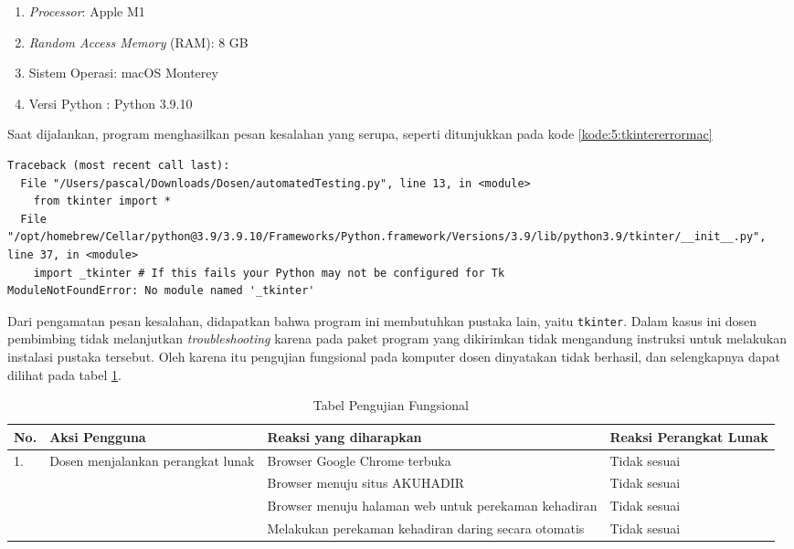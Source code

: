 \begin{enumerate}
	\item \textit{Processor}: Apple M1
	\item \textit{Random Access Memory} (RAM): 8 GB
	\item Sistem Operasi: macOS Monterey
	\item Versi Python : Python 3.9.10
\end{enumerate}

Saat dijalankan, program menghasilkan pesan kesalahan yang serupa, seperti ditunjukkan pada kode \ref{kode:5:tkintererrormac}

\begin{lstlisting}[caption=Pesan kesalahan skrip tanpa \textit{tkinter}) pada komputer alternatif, label=kode:5:tkintererrormac]
 % python3 automatedTesting.py
Traceback (most recent call last):
  File "/Users/pascal/Downloads/Dosen/automatedTesting.py", line 13, in <module>
    from tkinter import * 
  File "/opt/homebrew/Cellar/python@3.9/3.9.10/Frameworks/Python.framework/Versions/3.9/lib/python3.9/tkinter/__init__.py", line 37, in <module>
    import _tkinter # If this fails your Python may not be configured for Tk
ModuleNotFoundError: No module named '_tkinter'
\end{lstlisting}

Dari pengamatan pesan kesalahan, didapatkan bahwa program ini membutuhkan pustaka lain, yaitu \texttt{tkinter}. Dalam kasus ini dosen pembimbing tidak melanjutkan \textit{troubleshooting} karena pada paket program yang dikirimkan tidak mengandung instruksi untuk melakukan instalasi pustaka tersebut. Oleh karena itu pengujian fungsional pada komputer dosen dinyatakan tidak berhasil, dan selengkapnya dapat dilihat pada tabel \ref{tab:fungsidosen}.

\begin{table}[H]			
	\caption{Tabel Pengujian Fungsional}
	\centering
	\begin{tabular}{|p{0.5cm} |p{4cm} |p{5.5cm}| p{3cm}|} \hline
		No. & Aksi Pengguna & Reaksi yang diharapkan & Reaksi Perangkat Lunak\\ \hline     
		1. & Dosen menjalankan perangkat lunak & Browser Google Chrome terbuka & Tidak sesuai\\ \hline 
		 	& &  Browser menuju situs AKUHADIR & Tidak sesuai\\ \hline
		 	& &  Browser menuju halaman web untuk perekaman kehadiran & Tidak sesuai\\ \hline
		 	& &  Melakukan perekaman kehadiran daring secara otomatis & Tidak sesuai\\ \hline
	\end{tabular}
	\label{tab:fungsidosen}
\end{table}


